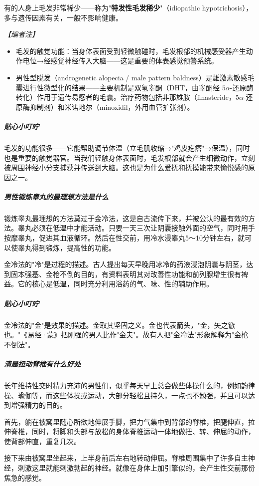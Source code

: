 有的人身上毛发非常稀少——称为"\textbf{特发性毛发稀少}"（idiopathic hypotrichosis），多与遗传因素有关，一般不影响健康。

\vspace{0.5em}
\noindent\textit{【编者注】}
\begin{itemize}
	\item 毛发的触觉功能：当身体表面受到轻微触碰时，毛发根部的机械感受器产生动作电位→经感觉神经传入大脑——这是重要的体表感觉预警系统。
	\item 男性型脱发（androgenetic alopecia / male pattern baldness）是雄激素敏感毛囊进行性微型化的结果——主要机制是双氢睾酮（DHT，由睾酮经 $5\alpha$-还原酶转化）作用于遗传易感者的毛囊。治疗药物包括非那雄胺（finasteride，$5\alpha$-还原酶抑制剂）和米诺地尔（minoxidil，外用血管扩张剂）。
\end{itemize}

\subparagraph{贴心小叮咛}

毛发的功能很多——它能帮助调节体温（立毛肌收缩→"鸡皮疙瘩"→保温），同时也是重要的触觉器官。当我们轻触身体表面时，毛发根部就会产生细微动作，立刻被周围神经小分支捕获并传送到大脑。这也是为什么爱抚和抚摸能带来愉悦感的原因之一。

\subparagraph{男性锻炼睾丸的最理想方法是什么}

锻炼睾丸最理想的方法莫过于金冷法，这是自古流传下来，并被公认的最有效的方法。睾丸必须在低温中才能活动。只要一天三次让阴囊接触外面的空气，同时用手按摩睾丸，促进其血液循环。然后在性交前，用冷水浸睾丸5～10分钟左右，就可以使睾丸得到锻炼，提高性的功能。

金冷法的"冷"是过程的描述。古人提出每天早晚用冰冷的药液浸泡阴囊与阴茎，达到固本强基、金枪不倒的目的，有资料表明其对改善性功能和前列腺增生很有裨益。它的核心是低温，同时充分利用浴药的气、味、性的辅助作用。

\subparagraph{贴心小叮咛}

金冷法的"金"是效果的描述。金取其坚固之义。金也代表箭头，"金，矢之镞也。"《易经·蒙》把刚强的男人比作"金夫"。故有人把"金冷法"形象解释为"金枪不倒法"。

\subparagraph{清晨扭动脊椎有什么好处}

长年维持性交时精力充沛的男性们，似乎每天早上总会做些体操什么的，例如韵律操、瑜伽等，而这些体操或运动，大部分轻松且持久，一点也不勉强，并且可以达到增强精力的目的。

首先，躺在被窝里随心所欲地伸展手脚，把力气集中到背部的脊椎，把腿伸直，拉伸脊椎，同时，将脚和头部与放松的身体脊椎运动一体地做扭、转、伸屈的动作，使背部伸直，重复几次。

接下来由被窝里坐起来，上半身前后左右地转动伸屈。脊椎周围集中了许多自主神经，刺激这里就能刺激勃起的神经。就像在身体上加引擎似的，会产生性交前那份焦急的感觉。

